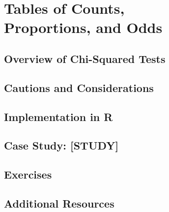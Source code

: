 
\chapter{Tables of Counts,\\ Proportions, and Odds}

\section{Overview of Chi-Squared Tests}

\section{Cautions and Considerations}

\section{Implementation in R}

\section{Case Study: [STUDY]}

\section{Exercises}

\section{Additional Resources}
